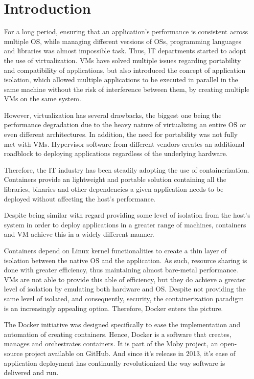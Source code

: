 \section{Introduction}
\label{sec::intro}

For a long period, ensuring that an application's performance is consistent across multiple \acs{OS}, while managing different versions of \acs{OS}s, programming languages and libraries was almost impossible task. Thus, IT departments started to adopt the use of virtualization. \acp{VM} have solved multiple issues regarding portability and compatibility of applications, but also introduced the concept of application isolation, which allowed multiple applications to be executed in parallel in the same machine without the risk of interference between them, by creating multiple \acp{VM} on the same system.

However, virtualization has several drawbacks, the biggest one being the performance degradation due to the heavy nature of virtualizing an entire \acs{OS} or even different architectures. In addition, the need for portability was not fully met with \acp{VM}. Hypervisor software from different vendors creates an additional roadblock to deploying applications regardless of the underlying hardware.

Therefore, the IT industry has been steadily adopting the use of containerization. Containers provide an lightweight and portable solution containing all the libraries, binaries and other dependencies a given application needs to be deployed without affecting the host's performance.

Despite being similar with regard providing some level of isolation from the host's system in order to deploy applications in a greater range of machines, containers and \acs{VM} achieve this in a widely different manner.

Containers depend on Linux kernel functionalities to create a thin layer of isolation between the native \acs{OS} and the application. As such, resource sharing is done with greater efficiency, thus maintaining almost bare-metal performance. \acp{VM} are not able to provide this able of efficiency, but they do achieve a greater level of isolation by emulating both hardware and \acs{OS}. Despite not providing the same level of isolated, and consequently, security, the containerization paradigm is an increasingly appealing option. Therefore, Docker enters the picture.

The Docker initiative was designed specifically to ease the implementation and automation of creating containers. Hence, Docker is a software that creates, manages and orchestrates containers. It is part of the Moby project, an open-source project available on GitHub. And since it's release in 2013, it's ease of application deployment has continually revolutionized the way software is delivered and run.

